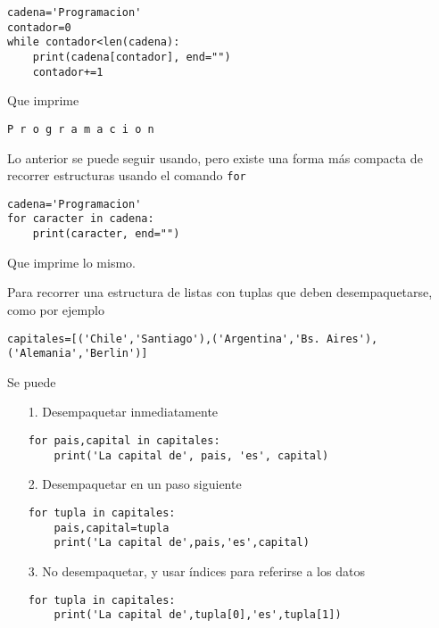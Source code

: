 \begin{lstlisting}[style=consola]
cadena='Programacion'
contador=0
while contador<len(cadena):
    print(cadena[contador], end="")
    contador+=1
\end{lstlisting}

Que imprime
\begin{lstlisting}[style=consola]
P r o g r a m a c i o n
\end{lstlisting}

Lo anterior se puede seguir usando, pero existe una forma más compacta de recorrer estructuras usando el comando \texttt{for}

\begin{lstlisting}[style=consola]
cadena='Programacion'
for caracter in cadena:
    print(caracter, end="")
\end{lstlisting}

Que imprime lo mismo.

Para recorrer una estructura de listas con tuplas que deben desempaquetarse, como por ejemplo
\begin{lstlisting}[style=consola]
capitales=[('Chile','Santiago'),('Argentina','Bs. Aires'),('Alemania','Berlin')]
\end{lstlisting}
Se puede
\begin{itemize}
    \item[1.] Desempaquetar inmediatamente 
    \begin{lstlisting}[style=consola]
for pais,capital in capitales:
    print('La capital de', pais, 'es', capital)
    \end{lstlisting}
    
    \item[2.] Desempaquetar en un paso siguiente
    \begin{lstlisting}[style=consola]
for tupla in capitales:
    pais,capital=tupla
    print('La capital de',pais,'es',capital)
    \end{lstlisting}
    
    \item[3.] No desempaquetar, y usar índices para referirse a los datos
    \begin{lstlisting}[style=consola]
for tupla in capitales:
    print('La capital de',tupla[0],'es',tupla[1])
    \end{lstlisting}
\end{itemize}